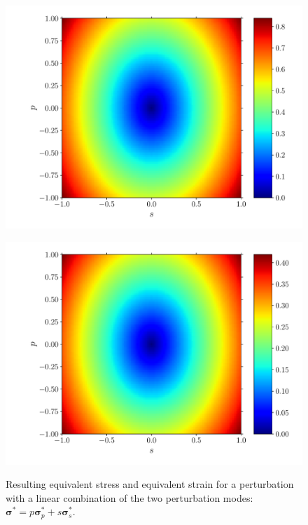 \documentclass{goose-article}
\begin{document}
\begin{figure}[htp]
    \centering
    \captionsetup[subfigure]{justification=centering}
    \begin{minipage}[t]{.49\textwidth}
        \centering
        \includegraphics[width=\textwidth]{phase-diagram_sig.pdf}
        \label{fig:phase-diagram:sig}
    \end{minipage}
    \hfill
    \begin{minipage}[t]{.49\textwidth}
        \centering
        \includegraphics[width=\textwidth]{phase-diagram_eps.pdf}
        \label{fig:phase-diagram:eps}
    \end{minipage}
    \caption{
        Resulting
         equivalent stress and
         equivalent strain
        for a perturbation with a linear combination of the two perturbation modes:
        $\bm{\sigma}^* = p \bm{\sigma}^*_p + s \bm{\sigma}^*_s$.
    }
    \label{fig:phase-diagram}
\end{figure}
\end{document}
